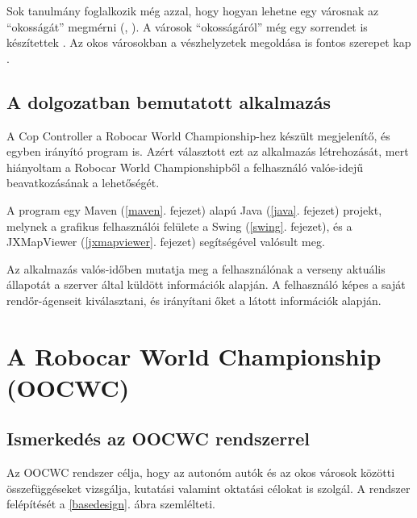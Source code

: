 \documentclass[a4paper,12pt]{report}
\begin{document}
\vspace{2mm}
Sok tanulmány foglalkozik még azzal, hogy hogyan lehetne egy városnak az ``okosságát'' megmérni (\cite{de2014smart}, \cite{carli2013measuring}). A városok ``okosságáról'' még egy sorrendet is készítettek \cite{giffinger2007smart}. Az okos városokban a vészhelyzetek megoldása is fontos szerepet kap \cite{du2012research}.

\section{A dolgozatban bemutatott alkalmazás}

A Cop Controller a Robocar World Championship-hez készült megjelenítő, és egyben irányító program is. Azért választott ezt az alkalmazás létrehozását, mert hiányoltam a Robocar World Championshipből a felhasználó valós-idejű beavatkozásának a lehetőségét.

\vspace{2mm}
A program egy Maven (\ref{maven}. fejezet) alapú Java (\ref{java}. fejezet) projekt, melynek a grafikus felhasználói felülete a Swing (\ref{swing}. fejezet), és a JXMapViewer (\ref{jxmapviewer}. fejezet) segítségével valósult meg. 

\vspace{2mm}
Az alkalmazás valós-időben mutatja meg a felhasználónak a verseny aktuális állapotát a szerver által küldött információk alapján. A felhasználó képes a saját rendőr-ágenseit kiválasztani, és irányítani őket a látott információk alapján.


\chapter{A Robocar World Championship (OOCWC)}
\label{oocwc}

\section{Ismerkedés az OOCWC rendszerrel}

Az OOCWC rendszer célja, hogy az autonóm autók és az okos városok közötti összefüggéseket vizsgálja, kutatási valamint oktatási célokat is szolgál. A rendszer felépítését a \ref{basedesign}. ábra szemlélteti.
\end{document}
